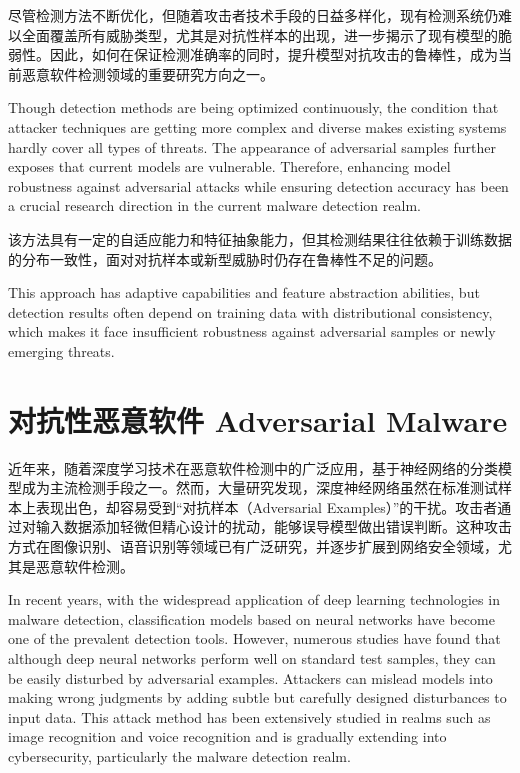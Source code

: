 尽管检测方法不断优化，但随着攻击者技术手段的日益多样化，现有检测系统仍难以全面覆盖所有威胁类型，尤其是对抗性样本的出现，进一步揭示了现有模型的脆弱性。因此，如何在保证检测准确率的同时，提升模型对抗攻击的鲁棒性，成为当前恶意软件检测领域的重要研究方向之一。

Though detection methods are being optimized continuously, the condition that attacker techniques are getting more complex and diverse makes existing systems hardly cover all types of threats. The appearance of adversarial samples further exposes that current models are vulnerable. Therefore, enhancing model robustness against adversarial attacks while ensuring detection accuracy has been a crucial research direction in the current malware detection realm. 

该方法具有一定的自适应能力和特征抽象能力，但其检测结果往往依赖于训练数据的分布一致性，面对对抗样本或新型威胁时仍存在鲁棒性不足的问题。

This approach has adaptive capabilities and feature abstraction abilities, but detection results often depend on training data with distributional consistency, which makes it face insufficient robustness against adversarial samples or newly emerging threats.  

\section{对抗性恶意软件 Adversarial Malware}
近年来，随着深度学习技术在恶意软件检测中的广泛应用，基于神经网络的分类模型成为主流检测手段之一。然而，大量研究发现，深度神经网络虽然在标准测试样本上表现出色，却容易受到“对抗样本（Adversarial Examples）”的干扰。攻击者通过对输入数据添加轻微但精心设计的扰动，能够误导模型做出错误判断。这种攻击方式在图像识别、语音识别等领域已有广泛研究，并逐步扩展到网络安全领域，尤其是恶意软件检测。

In recent years, with the widespread application of deep learning technologies in malware detection, classification models based on neural networks have become one of the prevalent detection tools. However, numerous studies have found that although deep neural networks perform well on standard test samples, they can be easily disturbed by adversarial examples. Attackers can mislead models into making wrong judgments by adding subtle but carefully designed disturbances to input data. This attack method has been extensively studied in realms such as image recognition and voice recognition and is gradually extending into cybersecurity, particularly the malware detection realm.

